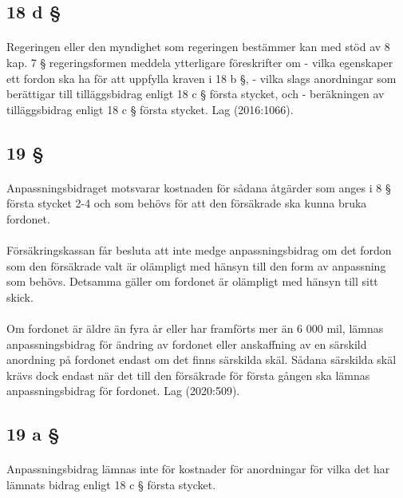 \documentclass[a4paper,notitlepage,openany,10pt]{book}
\begin{document}
\subsection*{18 d §}
\paragraph*{}
Regeringen eller den myndighet som regeringen bestämmer kan med stöd av 8 kap. 7 § regeringsformen meddela ytterligare föreskrifter om
\newline - vilka egenskaper ett fordon ska ha för att uppfylla kraven i 18 b §,
\newline - vilka slags anordningar som berättigar till tilläggsbidrag enligt 18 c § första stycket, och
\newline - beräkningen av tilläggsbidrag enligt 18 c § första stycket.
Lag (2016:1066).
\subsection*{19 §}
\paragraph*{}
Anpassningsbidraget motsvarar kostnaden för sådana åtgärder som anges i 8 § första stycket 2-4 och som behövs för att den försäkrade ska kunna bruka fordonet.
\paragraph*{}
Försäkringskassan får besluta att inte medge anpassningsbidrag om det fordon som den försäkrade valt är olämpligt med hänsyn till den form av anpassning som behövs. Detsamma gäller om fordonet är olämpligt med hänsyn till sitt skick.
\paragraph*{}
Om fordonet är äldre än fyra år eller har framförts mer än 6 000 mil, lämnas anpassningsbidrag för ändring av fordonet eller anskaffning av en särskild anordning på fordonet endast om det finns särskilda skäl. Sådana särskilda skäl krävs dock endast när det till den försäkrade för första gången ska lämnas anpassningsbidrag för fordonet.
Lag (2020:509).
\subsection*{19 a §}
\paragraph*{}
Anpassningsbidrag lämnas inte för kostnader för anordningar för vilka det har lämnats bidrag enligt 18 c § första stycket.
\end{document}
